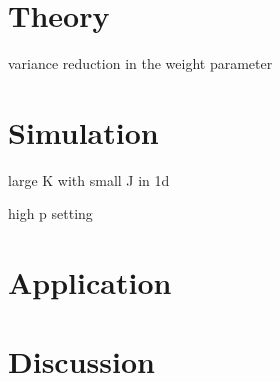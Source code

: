 \documentclass[12pt]{article}
\begin{document}
\section{Theory}

variance reduction in the weight parameter

\section{Simulation}

large K with small J in 1d

high p setting


\section{Application}
\section{Discussion}



\end{document}
